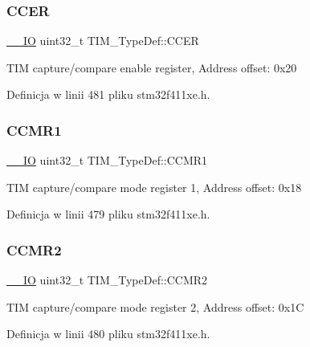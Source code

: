 \subsubsection{\texorpdfstring{C\+C\+ER}{CCER}}
{\footnotesize\ttfamily \hyperlink{core__sc300_8h_aec43007d9998a0a0e01faede4133d6be}{\+\_\+\+\_\+\+IO} uint32\+\_\+t T\+I\+M\+\_\+\+Type\+Def\+::\+C\+C\+ER}

T\+IM capture/compare enable register, Address offset\+: 0x20 

Definicja w linii 481 pliku stm32f411xe.\+h.

\mbox{\label{struct_t_i_m___type_def_a0f2291e7efdf3222689ef13e9be2ea4a}} 
\subsubsection{\texorpdfstring{C\+C\+M\+R1}{CCMR1}}
{\footnotesize\ttfamily \hyperlink{core__sc300_8h_aec43007d9998a0a0e01faede4133d6be}{\+\_\+\+\_\+\+IO} uint32\+\_\+t T\+I\+M\+\_\+\+Type\+Def\+::\+C\+C\+M\+R1}

T\+IM capture/compare mode register 1, Address offset\+: 0x18 

Definicja w linii 479 pliku stm32f411xe.\+h.

\mbox{\label{struct_t_i_m___type_def_aa8129ca70a2232c91c8cfcaf375249f6}} 
\subsubsection{\texorpdfstring{C\+C\+M\+R2}{CCMR2}}
{\footnotesize\ttfamily \hyperlink{core__sc300_8h_aec43007d9998a0a0e01faede4133d6be}{\+\_\+\+\_\+\+IO} uint32\+\_\+t T\+I\+M\+\_\+\+Type\+Def\+::\+C\+C\+M\+R2}

T\+IM capture/compare mode register 2, Address offset\+: 0x1C 

Definicja w linii 480 pliku stm32f411xe.\+h.

\mbox{\label{struct_t_i_m___type_def_a0dd9c06729a5eb6179c6d0d60faca7ed}} 
